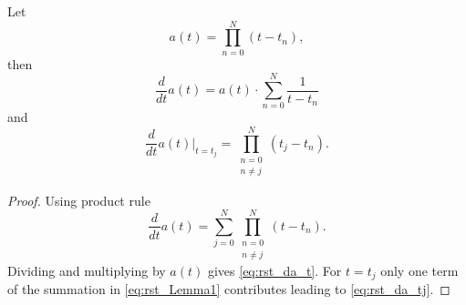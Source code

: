 \begin{lemma}
\label{lemma:rst_Lemma1}
Let
\begin{equation}
a(t) = \prod_{n=0}^{N}{(t-t_n)},
\label{eq:rst_a_t}
\end{equation}
then
\begin{equation}
\frac{d}{dt}a(t) = a(t)\cdot \sum_{n=0}^{N}{\frac{1}{t-t_n}}
\label{eq:rst_da_t}
\end{equation}
and
\begin{equation}
\frac{d}{dt}a(t)\biggr|_{t=t_j} = \prod_{\substack{n=0\\ n\neq j}}^{N}{(t_j-t_n)}.
\label{eq:rst_da_tj}
\end{equation}
\end{lemma}
\begin{proof}
Using product rule
\begin{equation}
\frac{d}{dt}a(t) = \sum_{j=0}^{N}{\prod_{\substack{n=0\\ n\neq j}}^{N}{(t-t_n)}}.
\label{eq:rst_Lemma1}
\end{equation}
Dividing and multiplying by $a(t)$ gives \eqref{eq:rst_da_t}. For $t=t_j$ only one term of the summation in \eqref{eq:rst_Lemma1} contributes leading to \eqref{eq:rst_da_tj}. \qedhere  
\end{proof}


